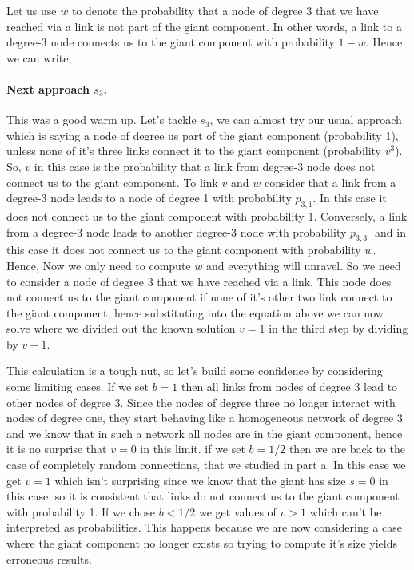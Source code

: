 Let us use $w$ to denote the probability that a node of degree 3 that we have reached via a link is not part of the giant component. In other words, a link to a degree-3 node connects us to the giant component with probability $1-w$. Hence we can write,
  \paragraph{Next approach $s_3$.} This was a good warm up. Let's tackle $s_3$, we can almost try our usual approach
 which is saying a node of degree us part of the giant component (probability 1), unless none of it's three links connect it to the giant component (probability $v^3$). So, $v$ in this case is the probability that a link from degree-3 node does not connect us to the giant component. To link $v$ and $w$ consider that a link from a degree-3 node leads to a node of degree 1 with probability $p_{3,1}$. In this case it does not connect us to the giant component with probability 1. Conversely, a link from a degree-3 node leads to another degree-3 node with probability $p_{3,3,}$ and in this case it does not connect us to the giant component with probability $w$. Hence,
 Now we only need to compute $w$ and everything will unravel. So we need to consider a node of degree 3 that we have reached via a link. This node does not connect us to the giant component if none of it's other two link connect to the giant component, hence
 substituting into the equation above we can now solve
 where we divided out the known solution $v=1$ in the third step by dividing by $v-1$.
 
 This calculation is a tough nut, so let's build some confidence by considering some limiting cases. If we set $b=1$ then all links from nodes of degree 3 lead to other nodes of degree 3. Since the nodes of degree three no longer interact with nodes of degree one, they start behaving like a homogeneous network of degree 3 and we know that in such a network all nodes are in the giant component, hence it is no surprise that $v=0$ in this limit. if we set $b=1/2$ then we are back to the case of completely random connections, that we studied in part a. In this case we get $v=1$ which isn't surprising since we know that the giant has size $s=0$ in this case, so it is consistent that links do not connect us to the giant component with probability 1. If we chose $b<1/2$ we get values of $v>1$ which can't be interpreted as probabilities. This happens because we are now considering a case where the giant component no longer exists so trying to compute it's size yields erroneous results.     
 
